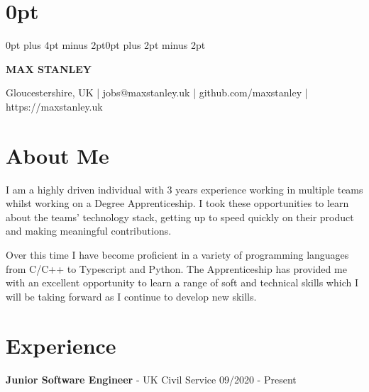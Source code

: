 \documentclass{article}
\begin{document}
\setlength\parindent{0pt}
\setlength{\parskip}{.8em} 
\titlespacing\section{0pt}{0pt plus 4pt minus 2pt}{0pt plus 2pt minus 2pt}

\newcommand*\emptycirc[1][1ex]{\tikz\draw (0,0) circle (#1);}
\newcommand*\fullcirc[1][1ex]{\tikz\fill (0,0) circle (#1);}

\newcount\myloopcounter
\newcommand{\repeatit}[2][10]{%
  \myloopcounter0%
  \loop\ifnum\myloopcounter < #1 %
  #2%
  \advance\myloopcounter by 1 %
  \repeat %
}

\begin{center}
\begin{huge}
\textbf{MAX STANLEY}
\end{huge}

Gloucestershire, UK
|
jobs@maxstanley.uk
|
github.com/maxstanley
|
https://maxstanley.uk

\end{center}

\section*{About Me}

I am a highly driven individual with 3 years experience working in multiple teams whilst working on a Degree Apprenticeship.
I took these opportunities to learn about the teams' technology stack, getting up to speed quickly on their product and making meaningful contributions.

Over this time I have become proficient in a variety of programming languages from C/C++ to Typescript and Python.
The Apprenticeship has provided me with an excellent opportunity to learn a range of soft and technical skills which I will be taking forward as I continue to develop new skills.

\section*{Experience}

\textbf{Junior Software Engineer} - UK Civil Service \hfill 09/2020 - Present
\end{document}

